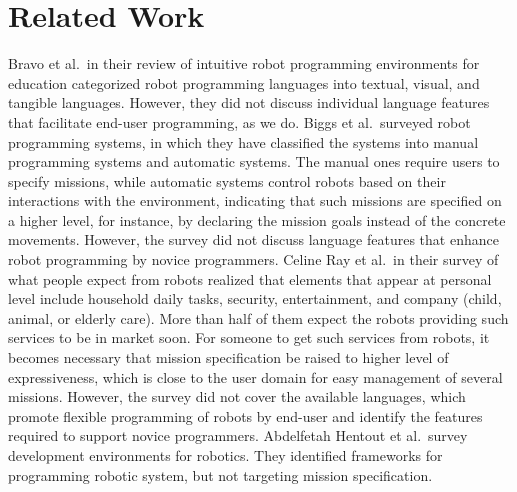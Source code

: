 \section{Related Work}

Bravo et al.\,\cite{Bravo2018} in their review of intuitive robot programming environments for education categorized robot programming languages into textual, visual, and tangible languages. However, they did not discuss individual language features that facilitate end-user programming, as we do. %
Biggs et al.\,\cite{Biggs2003} surveyed robot programming systems, in which they have classified the systems into manual programming systems and automatic systems. The manual ones require users to specify missions, while automatic systems control robots based on their interactions with the environment, indicating that such missions are specified on a higher level, for instance, by declaring the mission goals instead of the concrete movements. However, the survey did not discuss language features that enhance robot programming by novice programmers.
Celine Ray et al.\,\cite{CelineRayFrancescoMondadaMemberIEEEandRolandSiegwartFellow2008} in their survey of what people expect from robots realized that elements that appear at personal level include household daily tasks, security, entertainment, and company (child, animal, or elderly care). More than half of them expect the robots providing such services to be in market soon. For someone to get such services from robots, it becomes necessary that mission specification be raised to higher level of expressiveness, which is close to the user domain for easy management of several missions. However, the survey did not cover the available languages, which promote flexible programming of robots by end-user and identify the features required to support novice programmers.
Abdelfetah Hentout et al.\,\cite{Hentout2017} survey development environments for robotics. They identified frameworks for programming robotic system, but not targeting mission specification.


